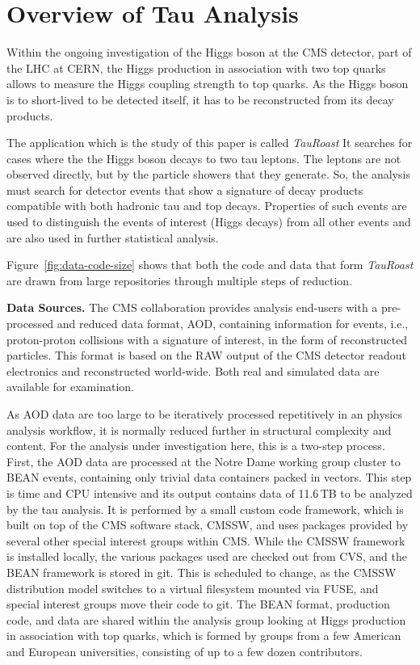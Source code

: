 \documentclass{acm_proc_article-sp}
\begin{document}
\section{Overview of Tau Analysis}

Within the ongoing investigation of the Higgs boson at the CMS
detector, part of the LHC at CERN, the Higgs production in association
with two top quarks allows to measure the Higgs coupling strength to
top quarks.  As the Higgs boson is to short-lived to be detected
itself, it has to be reconstructed from its decay products.

The application which is the study of this paper is called \emph{TauRoast}
It searches for cases where the the Higgs boson decays to two tau leptons.
The leptons are not observed directly, but by the particle showers
that they generate.  So, the analysis must search for detector
events that show a signature of decay products compatible with both hadronic tau and top decays.  Properties of such events are used to distinguish
the events of interest (Higgs decays) from all other events and
are also used in further statistical analysis.

Figure~\ref{fig:data-code-size} shows that both the code and data
that form \emph{TauRoast} are drawn from large repositories through
multiple steps of reduction.

{\bf Data Sources.}
The CMS collaboration provides analysis end-users with a pre-processed
and reduced data format, AOD, containing information for events, i.e.,
proton-proton collisions with a signature of interest, in the form of
reconstructed particles.  This format is based on the RAW output of
the CMS detector readout electronics and reconstructed world-wide.
Both real and simulated data are available for examination.

As AOD data are too large to be iteratively processed repetitively in
an physics analysis workflow, it is normally reduced further in
structural complexity and content.  For the analysis under
investigation here, this is a two-step process.  First, the AOD data
are processed at the Notre Dame working group cluster to BEAN events,
containing only trivial data containers packed in vectors.  This step
is time and CPU intensive and its output contains data of 11.6$\,$TB to be
analyzed by the tau analysis.
It is performed by a small custom code framework,
which is built on top of the CMS software stack, CMSSW,
and uses packages provided by several other special interest groups within CMS.
While the CMSSW framework is installed locally,
the various packages used are checked out from CVS,
and the BEAN framework is stored in git.
This is scheduled to change,
as the CMSSW distribution model switches to a virtual filesystem mounted via FUSE,
and special interest groups move their code to git.
The BEAN format, production code, and
data are shared within the analysis group looking at Higgs production
in association with top quarks, which is formed by groups from a few
American and European universities,
consisting of up to a few dozen contributors.
\end{document}

